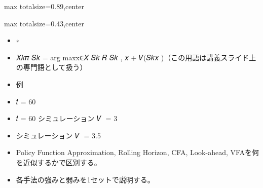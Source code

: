 \begin{minipage}[t]{0.58\textwidth}
\begin{adjustbox}{max totalsize={\textwidth}{0.89\textheight},center}
\begin{minipage}{\textwidth}
\end{minipage}
\end{adjustbox}
\end{minipage}


\clearpage
{}
\begin{minipage}[t]{0.405\textwidth}
\begin{adjustbox}{max totalsize={\textwidth}{0.43\textheight},center}
\begin{minipage}{\textwidth}\scriptsize
{}\begin{itemize}
\item ∗
\item 𝑋𝑘𝜋 𝑆𝑘 = arg maxx∈𝑋 𝑆𝑘 𝑅 𝑆𝑘 , 𝑥 + 𝑉(𝑆𝑘𝑥 )（この用語は講義スライド上の専門語として扱う）
\item 例
\item 𝑡 = 60
\item 𝑡 = 60 シミュレーション 𝑉෠ = 3
\item シミュレーション 𝑉෠ = 3.5
\end{itemize}\begin{itemize}
\item Policy Function Approximation, Rolling Horizon, CFA, Look-ahead, VFAを何を近似するかで区別する。
\item 各手法の強みと弱みを1セットで説明する。
\end{itemize}
\end{minipage}
\end{adjustbox}
\end{minipage}\hfill
